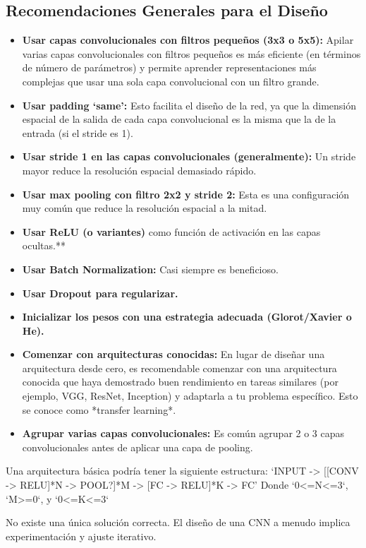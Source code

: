\documentclass{article}
\begin{document}
\subsection{Recomendaciones Generales para el Diseño}

\begin{itemize}
    \item \textbf{Usar capas convolucionales con filtros pequeños (3x3 o 5x5):}  Apilar varias capas convolucionales con filtros pequeños es más eficiente (en términos de número de parámetros) y permite aprender representaciones más complejas que usar una sola capa convolucional con un filtro grande.
    \item \textbf{Usar padding `same':}  Esto facilita el diseño de la red, ya que la dimensión espacial de la salida de cada capa convolucional es la misma que la de la entrada (si el stride es 1).
    \item \textbf{Usar stride 1 en las capas convolucionales (generalmente):}  Un stride mayor reduce la resolución espacial demasiado rápido.
    \item \textbf{Usar max pooling con filtro 2x2 y stride 2:}  Esta es una configuración muy común que reduce la resolución espacial a la mitad.
    \item \textbf{Usar ReLU (o variantes)} como función de activación en las capas ocultas.**
    \item \textbf{Usar Batch Normalization:}  Casi siempre es beneficioso.
    \item \textbf{Usar Dropout para regularizar.}
    \item \textbf{Inicializar los pesos con una estrategia adecuada (Glorot/Xavier o He).}
    \item \textbf{Comenzar con arquitecturas conocidas:}  En lugar de diseñar una arquitectura desde cero, es recomendable comenzar con una arquitectura conocida que haya demostrado buen rendimiento en tareas similares (por ejemplo, VGG, ResNet, Inception) y adaptarla a tu problema específico. Esto se conoce como *transfer learning*.
    \item \textbf{Agrupar varias capas convolucionales:} Es común agrupar 2 o 3 capas convolucionales antes de aplicar una capa de pooling.
\end{itemize}

Una arquitectura básica podría tener la siguiente estructura:
`INPUT -> [[CONV -> RELU]*N -> POOL?]*M -> [FC -> RELU]*K -> FC'
Donde `0<=N<=3`, `M>=0`, y `0<=K<=3`

No existe una única solución correcta. El diseño de una CNN a menudo implica experimentación y ajuste iterativo.
\end{document}
